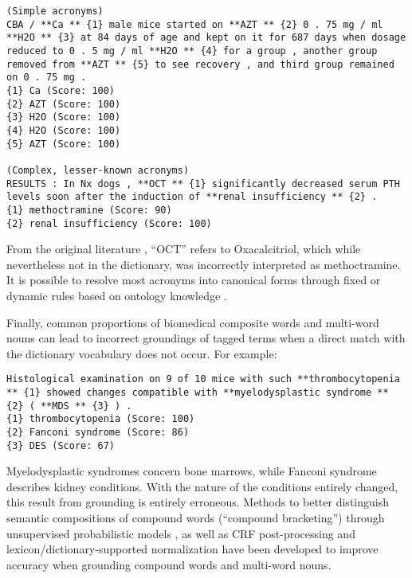 \documentclass[10pt, oneside]{article}
\begin{document}
\begin{lstlisting}[breaklines]
(Simple acronyms)
CBA / **Ca ** {1} male mice started on **AZT ** {2} 0 . 75 mg / ml **H2O ** {3} at 84 days of age and kept on it for 687 days when dosage reduced to 0 . 5 mg / ml **H2O ** {4} for a group , another group removed from **AZT ** {5} to see recovery , and third group remained on 0 . 75 mg . 
{1} Ca (Score: 100)
{2} AZT (Score: 100)
{3} H2O (Score: 100)
{4} H2O (Score: 100)
{5} AZT (Score: 100)

(Complex, lesser-known acronyms)
RESULTS : In Nx dogs , **OCT ** {1} significantly decreased serum PTH levels soon after the induction of **renal insufficiency ** {2} . 
{1} methoctramine (Score: 90)
{2} renal insufficiency (Score: 100)
\end{lstlisting}

From the original literature \cite{monier199922}, ``OCT'' refers to Oxacalcitriol, which while nevertheless not in the dictionary, was incorrectly interpreted as methoctramine. It is possible to resolve most acronyms into canonical forms through fixed or dynamic rules based on ontology knowledge \cite{naderi2011organismtagger}.

Finally, common proportions of biomedical composite words and multi-word nouns can lead to incorrect groundings of tagged terms when a direct match with the dictionary vocabulary does not occur. For example:

\begin{lstlisting}[breaklines]
Histological examination on 9 of 10 mice with such **thrombocytopenia ** {1} showed changes compatible with **myelodysplastic syndrome ** {2} ( **MDS ** {3} ) . 
{1} thrombocytopenia (Score: 100)
{2} Fanconi syndrome (Score: 86)
{3} DES (Score: 67)
\end{lstlisting}

Myelodysplastic syndromes concern bone marrows, while Fanconi syndrome describes kidney conditions. With the nature of the conditions entirely changed, this result from grounding is entirely erroneous. Methods to better distinguish semantic compositions of compound words (``compound bracketing'') through unsupervised probabilistic models \cite{pecina2010lexical}, as well as CRF post-processing and lexicon/dictionary-supported normalization \cite{lee2016audis} have been developed to improve accuracy when grounding compound words and multi-word nouns.
\end{document}
